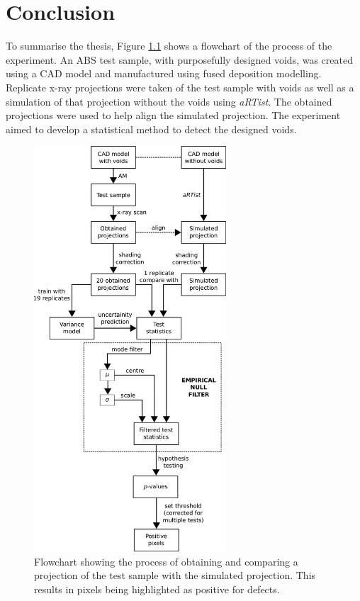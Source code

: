 \documentclass[12pt, a4paper, twoside]{memoir}
\begin{document}
\chapter{Conclusion}
\label{chapter6}
To summarise the thesis, Figure \ref{fig:evaluation_flowchart} shows a flowchart of the process of the experiment. An ABS test sample, with purposefully designed voids, was created using a CAD model and manufactured using fused deposition modelling. Replicate x-ray projections were taken of the test sample with voids as well as a simulation of that projection without the voids using \emph{aRTist}. The obtained projections were used to help align the simulated projection. The experiment aimed to develop a statistical method to detect the designed voids.

\begin{figure}
  \centering
  \includegraphics[width=0.64\textwidth]{../figures/flowchart.png}
  \caption{Flowchart showing the process of obtaining and comparing a projection of the test sample with the simulated projection. This results in pixels being highlighted as positive for defects.}
  \label{fig:evaluation_flowchart}
\end{figure}
\end{document}
